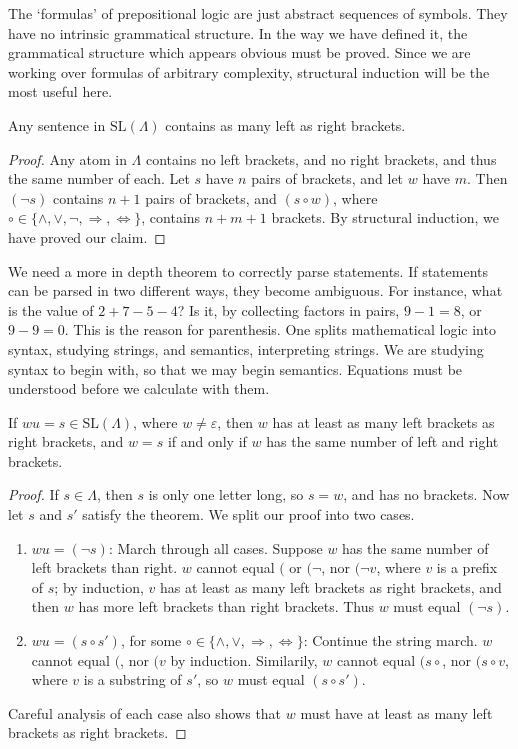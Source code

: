 The `formulas' of prepositional logic are just abstract sequences of symbols. They have no intrinsic grammatical structure. In the way we have defined it, the grammatical structure which appears obvious must be proved. Since we are working over formulas of arbitrary complexity, structural induction will be the most useful here.

\begin{theorem}
    Any sentence in $\text{SL}(\Lambda)$ contains as many left as right brackets.
\end{theorem}
\begin{proof}
    Any atom in $\Lambda$ contains no left brackets, and no right brackets, and thus the same number of each. Let $s$ have $n$ pairs of brackets, and let $w$ have $m$. Then $(\neg s)$ contains $n + 1$ pairs of brackets, and $(s \circ w)$, where $\circ \in \{ \wedge, \vee, \neg, \Rightarrow, \Leftrightarrow \}$, contains $n + m + 1$ brackets. By structural induction, we have proved our claim.
\end{proof}

We need a more in depth theorem to correctly parse statements. If statements can be parsed in two different ways, they become ambiguous. For instance, what is the value of $2 + 7 - 5 - 4$? Is it, by collecting factors in pairs, $9 - 1 = 8$, or $9 - 9 = 0$. This is the reason for parenthesis. One splits mathematical logic into syntax, studying strings, and semantics, interpreting strings. We are studying syntax to begin with, so that we may begin semantics. Equations must be understood before we calculate with them.

\begin{theorem}
    If $wu = s \in \text{SL}(\Lambda)$, where $w \neq \varepsilon$, then $w$ has at least as many left brackets as right brackets, and $w = s$ if and only if $w$ has the same number of left and right brackets.
\end{theorem}
\begin{proof}
    If $s \in \Lambda$, then $s$ is only one letter long, so $s = w$, and has no brackets. Now let $s$ and $s'$ satisfy the theorem. We split our proof into two cases.
    \begin{enumerate}
        \item $wu = (\neg s)$: March through all cases. Suppose $w$ has the same number of left brackets than right. $w$ cannot equal $($ or $(\neg$, nor $(\neg v$, where $v$ is a prefix of $s$; by induction, $v$ has at least as many left brackets as right brackets, and then $w$ has more left brackets than right brackets. Thus $w$ must equal $(\neg s)$.
        \item $wu = (s \circ s')$, for some $\circ \in \{ \wedge, \vee, \Rightarrow, \Leftrightarrow \}$: Continue the string march. $w$ cannot equal $($, nor $(v$ by induction. Similarily, $w$ cannot equal $(s \circ$, nor $(s \circ v$, where $v$ is a substring of $s'$, so $w$ must equal $(s \circ s')$.
    \end{enumerate}
    Careful analysis of each case also shows that $w$ must have at least as many left brackets as right brackets.
\end{proof}

